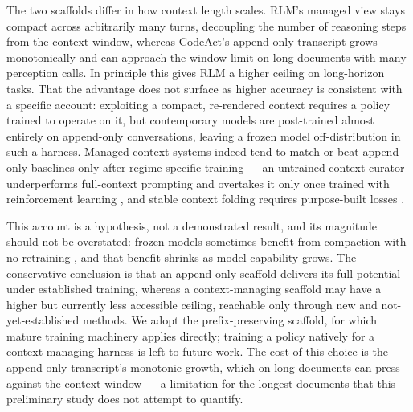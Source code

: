 The two scaffolds differ in how context length scales. RLM's managed view stays compact across arbitrarily many turns, decoupling the number of reasoning steps from the context window, whereas CodeAct's append-only transcript grows monotonically and can approach the window limit on long documents with many perception calls. In principle this gives RLM a higher ceiling on long-horizon tasks. That the advantage does not surface as higher accuracy is consistent with a specific account: exploiting a compact, re-rendered context requires a policy trained to operate on it, but contemporary models are post-trained almost entirely on append-only conversations, leaving a frozen model off-distribution in such a harness. Managed-context systems indeed tend to match or beat append-only baselines only after regime-specific training --- an untrained context curator underperforms full-context prompting and overtakes it only once trained with reinforcement learning \citep{contextcurator}, and stable context folding requires purpose-built losses \citep{foldact}.

This account is a hypothesis, not a demonstrated result, and its magnitude should not be overstated: frozen models sometimes benefit from compaction with no retraining \citep{resum}, and that benefit shrinks as model capability grows. The conservative conclusion is that an append-only scaffold delivers its full potential under established training, whereas a context-managing scaffold may have a higher but currently less accessible ceiling, reachable only through new and not-yet-established methods. We adopt the prefix-preserving scaffold, for which mature training machinery applies directly; training a policy natively for a context-managing harness is left to future work. The cost of this choice is the append-only transcript's monotonic growth, which on long documents can press against the context window --- a limitation for the longest documents that this preliminary study does not attempt to quantify.
